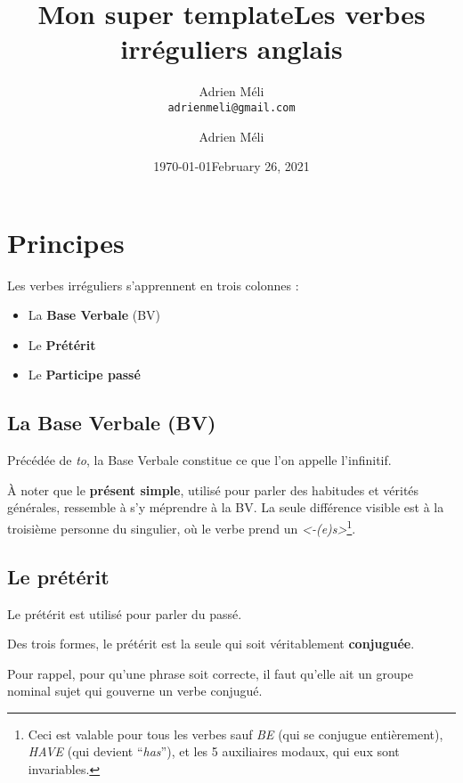 \documentclass[
  10pt,
]{article}
\title{Mon super template}
\author{Adrien M\'{e}li\\{\tt adrienmeli@gmail.com}}
\date{\today}
\title{Les verbes irréguliers anglais}
\author{Adrien Méli}
\date{February 26, 2021}
\begin{document}
\maketitle


\hypertarget{principes}{%
\section{Principes}\label{principes}}

Les verbes irréguliers s'apprennent en trois colonnes :

\begin{itemize}
\item
  La \textbf{Base Verbale} (BV)
\item
  Le \textbf{Prétérit}
\item
  Le \textbf{Participe passé}
\end{itemize}

\hypertarget{la-base-verbale-bv}{%
\subsection{La Base Verbale (BV)}\label{la-base-verbale-bv}}

Précédée de \emph{to}, la Base Verbale constitue ce que l'on appelle l'infinitif.

À noter que le \textbf{présent simple}, utilisé pour parler des habitudes et vérités générales, ressemble à s'y méprendre à la BV.
La seule différence visible est à la troisième personne du singulier, où le verbe prend un \emph{\textless-(e)s\textgreater{}}\footnote{Ceci est valable pour tous les verbes sauf \emph{BE} (qui se conjugue entièrement), \emph{HAVE} (qui devient ``\emph{has}''), et les 5 auxiliaires modaux, qui eux sont invariables.}.

\hypertarget{le-pruxe9tuxe9rit}{%
\subsection{Le prétérit}\label{le-pruxe9tuxe9rit}}

Le prétérit est utilisé pour parler du passé.

Des trois formes, le prétérit est la seule qui soit véritablement \textbf{conjuguée}.

Pour rappel, pour qu'une phrase soit correcte, il faut qu'elle ait un groupe nominal sujet qui gouverne un verbe conjugué.
\end{document}
